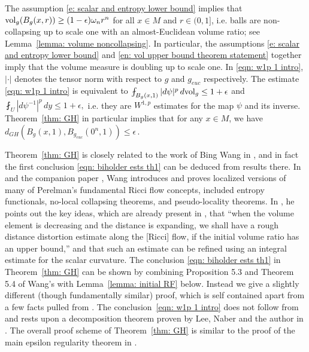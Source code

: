 \documentclass[11pt,reqno]{amsart}
\theoremstyle{remark}
\theoremstyle{definition}
\numberwithin{equation}{section}
\newcommand{\e}{{\epsilon}}
\newcommand{\vol}{{\rm{vol}}}
\begin{document}
The assumption \eqref{e: scalar and entropy lower bound} implies that  ${ \vol_g(B_g(x,r))}\geq (1 - \e)\omega_n r^n $ for all $x \in M$ and $r \in (0,1]$, i.e. balls are non-collapsing up to scale one with an almost-Euclidean volume ratio; see Lemma~\ref{lemma: volume noncollapsing}. In particular, the assumptions \eqref{e: scalar and entropy lower bound} and \eqref{en: vol upper bound theorem statement} together imply that the volume measure is doubling up to scale one. In \eqref{eqn: w1p 1 intro}, $|\cdot|$ denotes the tensor norm with respect to $g$ and $g_{euc}$ respectively. The estimate \eqref{eqn: w1p 1 intro} is equivalent to $\fint_{B_g(x,1)} |d \psi|^p\,d\vol_g \leq 1+\e$ and $\fint_{U}  |d\psi^{-1}|^p\,dy \leq 1+\e,$ i.e. they are $W^{1,p}$ estimates for the map $\psi$ and its inverse. 
Theorem~\ref{thm: GH} in particular implies that for any $x \in M$, we have
$d_{G H}\left(B_g(x, 1), B_{g_{euc}}(0^n, 1)\right) \leq \e\,.$



Theorem~\ref{thm: GH} is closely related to the work of Bing Wang in \cite{BingWangB}, and in fact the first conclusion \eqref{eqn: biholder ests th1} can be deduced from results there. In \cite{BingWangB} and the companion paper \cite{BingWangA}, Wang introduces and proves localized versions of many of Perelman's fundamental Ricci flow  concepts, included entropy functionals, no-local collapsing theorems, and pseudo-locality theorems. In \cite[Section 5]{BingWangB}, he points out the key ideas, which are already present in \cite{TianWang}, that ``when the volume element is decreasing and the distance is expanding, we shall have a rough distance distortion estimate along the [Ricci] flow, if the initial volume ratio has an upper bound,'' and that such an estimate can be refined using an integral estimate for the scalar curvature. The conclusion \eqref{eqn: biholder ests th1} in Theorem~\ref{thm: GH} can be shown by combining Proposition 5.3 and Theorem 5.4 of Wang's \cite{BingWangB} with Lemma~\ref{lemma: initial RF} below. Instead we give a slightly different (though fundamentally similar) proof, which is self contained apart from a few facts pulled from \cite{LNN1}. The conclusion~\eqref{eqn: w1p 1 intro} does not follow from \cite{BingWangB} and rests upon a decomposition theorem proven by Lee, Naber and the author in \cite{LNN1}. The overall proof scheme of Theorem~\ref{thm: GH} is similar to the proof of the main epsilon regularity theorem in  \cite[Theorem 1.1]{LNN1}.
\end{document}
